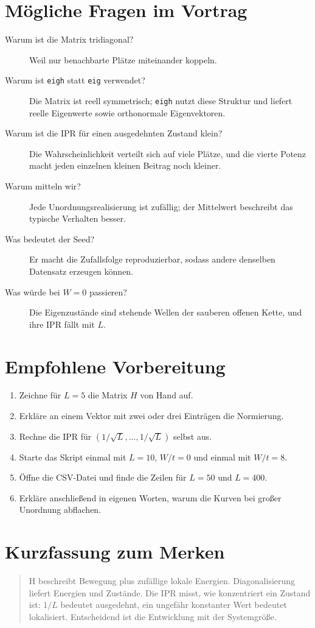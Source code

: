 \documentclass[11pt,a4paper]{article}
\begin{document}
\section{Mögliche Fragen im Vortrag}
\begin{description}
 \item[Warum ist die Matrix tridiagonal?] Weil nur benachbarte Plätze
 miteinander koppeln.
 \item[Warum ist \texttt{eigh} statt \texttt{eig} verwendet?] Die Matrix
 ist reell symmetrisch; \texttt{eigh} nutzt diese Struktur und liefert
 reelle Eigenwerte sowie orthonormale Eigenvektoren.
 \item[Warum ist die IPR für einen ausgedehnten Zustand klein?] Die
 Wahrscheinlichkeit verteilt sich auf viele Plätze, und die vierte Potenz
 macht jeden einzelnen kleinen Beitrag noch kleiner.
 \item[Warum mitteln wir?] Jede Unordnungsrealisierung ist zufällig; der
 Mittelwert beschreibt das typische Verhalten besser.
 \item[Was bedeutet der Seed?] Er macht die Zufallsfolge reproduzierbar,
 sodass andere denselben Datensatz erzeugen können.
 \item[Was würde bei $W=0$ passieren?] Die Eigenzustände sind
 stehende Wellen der sauberen offenen Kette, und ihre IPR fällt mit $L$.
\end{description}

\section{Empfohlene Vorbereitung}
\begin{enumerate}
 \item Zeichne für $L=5$ die Matrix $H$ von Hand auf.
 \item Erkläre an einem Vektor mit zwei oder drei Einträgen die Normierung.
 \item Rechne die IPR für $(1/\sqrt{L},\ldots,1/\sqrt{L})$ selbst aus.
 \item Starte das Skript einmal mit $L=10$, $W/t=0$ und einmal mit
 $W/t=8$.
 \item Öffne die CSV-Datei und finde die Zeilen für $L=50$ und $L=400$.
 \item Erkläre anschließend in eigenen Worten, warum die Kurven bei großer
 Unordnung abflachen.
\end{enumerate}

\section*{Kurzfassung zum Merken}
\begin{quote}
 H beschreibt Bewegung plus zufällige lokale Energien. Diagonalisierung
 liefert Energien und Zustände. Die IPR misst, wie konzentriert ein Zustand
 ist: $1/L$ bedeutet ausgedehnt, ein ungefähr konstanter Wert bedeutet
 lokalisiert. Entscheidend ist die Entwicklung mit der Systemgröße.
\end{quote}
\end{document}
